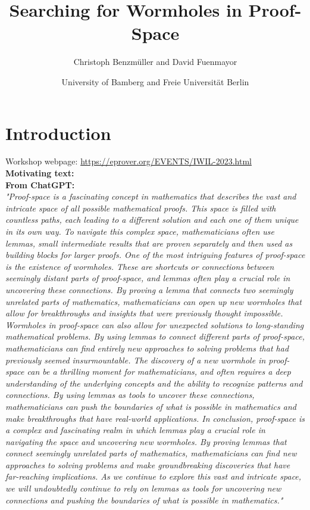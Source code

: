 \documentclass{article}
\title{Searching for Wormholes in Proof-Space}
\author{Christoph Benzmüller and David Fuenmayor}
\date{University of Bamberg and Freie Universität Berlin}
\begin{document}
\maketitle

\section{Introduction}

Workshop webpage: \url{https://eprover.org/EVENTS/IWIL-2023.html}
\\
\textbf{Motivating text:}
\\

\textbf{From ChatGPT:}
\\
\textit{"Proof-space is a fascinating concept in mathematics that describes the vast and intricate space of all possible mathematical proofs. This space is filled with countless paths, each leading to a different solution and each one of them unique in its own way. To navigate this complex space, mathematicians often use lemmas, small intermediate results that are proven separately and then used as building blocks for larger proofs.
One of the most intriguing features of proof-space is the existence of wormholes. These are shortcuts or connections between seemingly distant parts of proof-space, and lemmas often play a crucial role in uncovering these connections. By proving a lemma that connects two seemingly unrelated parts of mathematics, mathematicians can open up new wormholes that allow for breakthroughs and insights that were previously thought impossible.
Wormholes in proof-space can also allow for unexpected solutions to long-standing mathematical problems. By using lemmas to connect different parts of proof-space, mathematicians can find entirely new approaches to solving problems that had previously seemed insurmountable.
The discovery of a new wormhole in proof-space can be a thrilling moment for mathematicians, and often requires a deep understanding of the underlying concepts and the ability to recognize patterns and connections. By using lemmas as tools to uncover these connections, mathematicians can push the boundaries of what is possible in mathematics and make breakthroughs that have real-world applications.
In conclusion, proof-space is a complex and fascinating realm in which lemmas play a crucial role in navigating the space and uncovering new wormholes. By proving lemmas that connect seemingly unrelated parts of mathematics, mathematicians can find new approaches to solving problems and make groundbreaking discoveries that have far-reaching implications. As we continue to explore this vast and intricate space, we will undoubtedly continue to rely on lemmas as tools for uncovering new connections and pushing the boundaries of what is possible in mathematics."}
\end{document}
